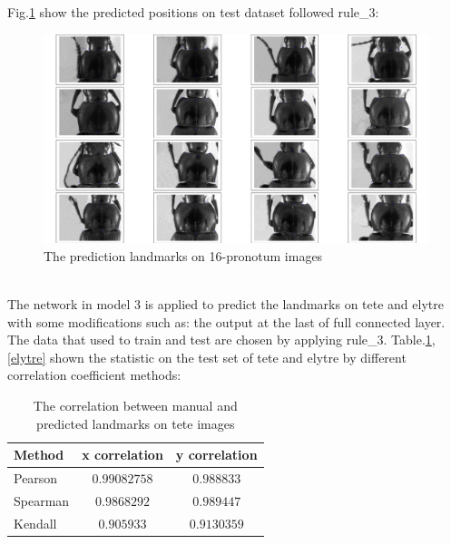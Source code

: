 Fig.\ref{cnn3t} show the predicted positions on test dataset followed rule\_3:
\begin{figure}[h!]
	\centering
	\includegraphics[scale=0.2]{images/figure_1_cnn3_5000_v13}
	\caption{The prediction landmarks on 16-pronotum images}
	\label{cnn3t}
\end{figure}~\\[2cm]
The network in model 3 is applied to predict the landmarks on tete and elytre with some modifications such as: the output at the last of full connected layer. The data that used to train and test are chosen by applying rule\_3. Table.\ref{tete},\ref{elytre} shown the statistic on the test set of tete and elytre by different correlation coefficient methods:
\begin{table}[h!]
	\centering
	\begin{tabular}{l c c}
		Method & x correlation & y correlation \\ \hline
		Pearson & $0.99082758$ & $0.988833$ \\ \hline
		Spearman & $0.9868292$ & $0.989447$ \\ \hline
		Kendall & $0.905933$ & $0.9130359$ \\ \hline
	\end{tabular}
	\caption{The correlation between manual and predicted landmarks on tete images}
	\label{tete}
\end{table}
